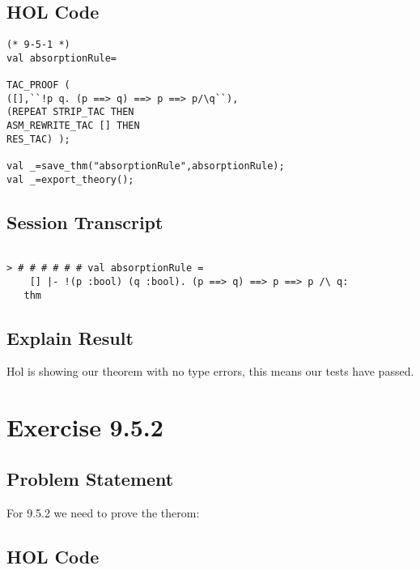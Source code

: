 \documentclass{report}
\begin{document}
\section{HOL Code}
\label{HOl Code 841}

\begin{lstlisting}[frame=trBL]
(* 9-5-1 *)
val absorptionRule=

TAC_PROOF (
([],``!p q. (p ==> q) ==> p ==> p/\q``),
(REPEAT STRIP_TAC THEN
ASM_REWRITE_TAC [] THEN
RES_TAC) );

val _=save_thm("absorptionRule",absorptionRule);
val _=export_theory();
\end{lstlisting}

\section{Session Transcript}
\label{Session Trans1}

\setcounter{sessioncount}{0}
\begin{session}
  \begin{scriptsize}
\begin{verbatim}

> # # # # # # val absorptionRule =
    [] |- !(p :bool) (q :bool). (p ==> q) ==> p ==> p /\ q:
   thm
\end{verbatim}
  \end{scriptsize}
\end{session}

\section{Explain Result}
\label{eplain re 951}
Hol is showing our theorem with no type errors, this means our tests have passed.


\chapter{Exercise 9.5.2}
\label{ex 952}

\section{Problem Statement}
\label{problem state 952}
For 9.5.2 we need to prove the therom:
\HOLexerciseNineTheoremsconstructiveDilemmaRule

\section{HOL Code}
\label{HOl Code 952}
\end{document}
